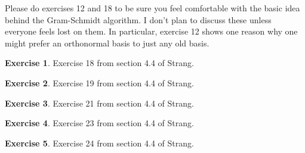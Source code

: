 \documentclass[11pt]{amsart}
\theoremstyle{definition}
\newtheorem{exercise}{Exercise}
\begin{document}
Please do exercises 12 and 18 to be sure you feel comfortable with the basic idea behind the Gram-Schmidt algorithm. I don't plan to discuss these unless everyone feels lost on them. In particular, exercise 12 shows one reason why one might prefer an orthonormal basis to just any old basis.


\begin{exercise}
Exercise 18 from section 4.4 of Strang.
\end{exercise}

\begin{exercise}
Exercise 19 from section 4.4 of Strang.
\end{exercise}

\begin{exercise}
Exercise 21 from section 4.4 of Strang.
\end{exercise}

\begin{exercise}
Exercise 23 from section 4.4 of Strang.
\end{exercise}

\begin{exercise}
Exercise 24 from section 4.4 of Strang.
\end{exercise}
\end{document}
